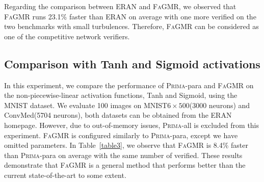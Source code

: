 \documentclass[runningheads]{llncs}
\newcommand{\ourtool}{\textsc{FaGMR}\xspace}
\newcommand{\prima}{\textsc{Prima}\xspace}
\newcommand{\mnist}{MNIST\xspace}
\newcommand{\eran}{\textsc{ERAN}\xspace}
\begin{document}
Regarding the comparison between \eran and \ourtool, we observed that \ourtool runs 23.1\% faster than \eran on average with one more verified on the two benchmarks with small turbulences. Therefore, \ourtool can be considered as one of the competitive network verifiers.


%
%
%
\subsection{Comparison with Tanh and Sigmoid activations}
In this experiment, we compare the performance of \prima-para and \ourtool on the non-piecewise-linear activation functions, Tanh and Sigmoid, using the \mnist dataset. We evaluate 100 images on \mnist $6\times 500$(3000 neurons) and ConvMed(5704 neurons), both datasets can be obtained from the \eran homepage. However, due to out-of-memory issues, \prima-all is excluded from this experiment.
\ourtool is configured similarly to \prima-para, except we have omitted parameters. In Table~\ref{table3}, we observe that \ourtool is 8.4\% faster than \prima-para on average with the same number of verified. These results demonstrate that \ourtool is a general method that performs better than the current state-of-the-art to some extent.
\end{document}
